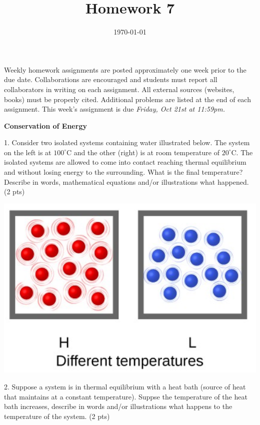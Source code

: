 \documentclass[12pt]{article}
\title{\textbf{Homework 7}}
\date{\vspace{-2em}\today}
\begin{document}
\maketitle 

Weekly homework assignments are posted approximately one week prior to the
due date. Collaborations are encouraged and students must report all collaborators
in writing on each assignment. All external sources (websites, books) must be
properly cited. Additional problems are listed at the end of each assignment.
This week's assignment is due \textit{Friday, Oct 21st at 11:59pm.}

\textbf{Conservation of Energy}

1. Consider two isolated systems containing water illustrated below. The system on the left is
at $100^\circ\text{C}$ and the other (right) is at room temperature of $20^\circ\text{C}$. The
isolated systems are allowed to come into contact reaching thermal equilibrium and without losing
energy to the surrounding. What is the final temperature? Describe in words, mathematical
equations and/or illustrations what happened. (2 pts)

\begin{center}
  \includegraphics[scale=0.25]{isolated_sys.png}
\end{center}


\newpage

2. Suppose a system is in thermal equilibrium with a heat bath (source of heat that
maintains at a constant temperature). Suppse the temperature of the heat bath increases,
describe in words and/or illustrations what happens to the temperature of the system. (2 pts)

\vspace{2.5in}
\end{document}
